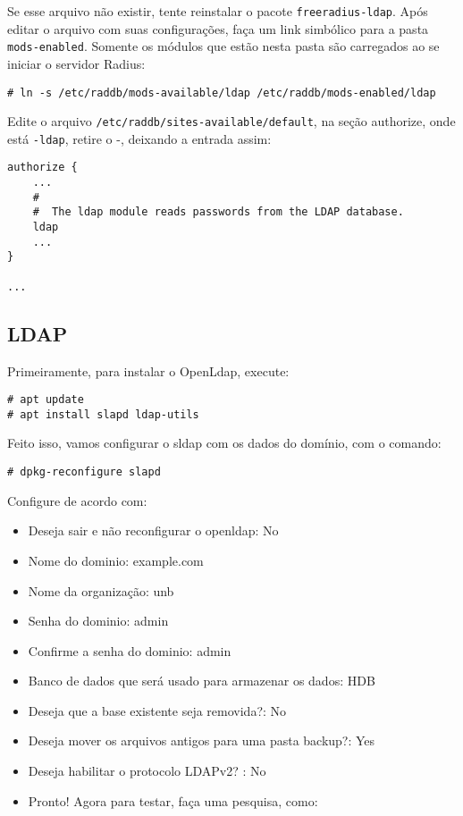 Se esse arquivo não existir, tente reinstalar o pacote \verb|freeradius-ldap|. Após
editar o arquivo com suas configurações, faça um link simbólico para a pasta
\verb|mods-enabled|. Somente os módulos que estão nesta pasta são carregados ao
se iniciar o servidor Radius:
\begin{verbatim}
# ln -s /etc/raddb/mods-available/ldap /etc/raddb/mods-enabled/ldap
\end{verbatim}


Edite o arquivo \verb|/etc/raddb/sites-available/default|, na seção authorize,
onde está \verb|-ldap|, retire o -, deixando a entrada assim:
\begin{verbatim}
authorize {
    ...
    #
    #  The ldap module reads passwords from the LDAP database.
    ldap
    ...
}

...

\end{verbatim}

\subsection{LDAP}

Primeiramente, para instalar o OpenLdap, execute:
\begin{verbatim}
# apt update
# apt install slapd ldap-utils
\end{verbatim}

Feito isso, vamos configurar o sldap com os dados do domínio, com o comando:

\begin{verbatim}
# dpkg-reconfigure slapd
\end{verbatim}

Configure de acordo com:
\begin{itemize}
    \item Deseja sair e não reconfigurar o openldap: No
    \item Nome do dominio: example.com
    \item Nome da organização: unb
    \item Senha do dominio: admin
    \item Confirme a senha do dominio: admin
    \item Banco de dados que será usado para armazenar os dados: HDB
    \item Deseja que a base existente seja removida?: No
    \item Deseja mover os arquivos antigos para uma pasta backup?: Yes
    \item Deseja habilitar o protocolo LDAPv2? : No
    \item Pronto! Agora para testar, faça uma pesquisa, como:
\end{itemize}

